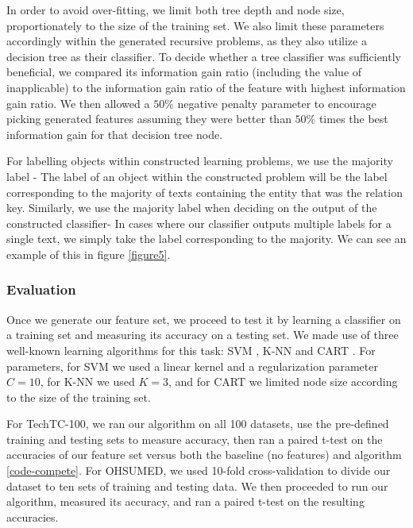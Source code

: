 \documentclass[twoside,11pt]{article}
\theoremstyle{definition}
\begin{document}
In order to avoid over-fitting, we limit both tree depth and node size, proportionately to the size of the training set. We also limit these parameters accordingly within the generated recursive problems, as they also utilize a decision tree as their classifier. To decide whether a tree classifier was sufficiently beneficial, we compared its information gain ratio (including the value of inapplicable) to the information gain ratio of the feature with highest information gain ratio. We then allowed a $50\%$ negative penalty parameter to encourage picking generated features assuming they were better than $50\%$ times the best information gain for that decision tree node. 

For labelling objects within constructed learning problems, we use the majority label - The label of an object within the constructed problem will be the label corresponding to the majority of texts containing the entity that was the relation key. Similarly, we use the majority label when deciding on the output of the constructed classifier- In cases where our classifier outputs multiple labels for a single text, we simply take the label corresponding to the majority. We can see an example of this in figure \ref{figure5}.

\subsubsection{Evaluation}

Once we generate our feature set, we proceed to test it by learning a classifier on a training set and measuring its accuracy on a testing set. We made use of three well-known learning algorithms for this task: SVM \cite{cortes1995support}, K-NN \cite{fix1951discriminatory} and CART \cite {breiman1984classification}.
For parameters, for SVM we used a linear kernel and a regularization parameter $C=10$, for K-NN we used $K=3$, and for CART we limited node size according to the size of the training set.

For TechTC-100, we ran our algorithm on all 100 datasets, use the pre-defined training and testing sets to measure accuracy, then ran a paired t-test on the accuracies of our feature set versus both the baseline (no features) and algorithm \ref{code-compete}.
For OHSUMED, we used 10-fold cross-validation to divide our dataset to ten sets of training and testing data. We then proceeded to run our algorithm, measured its accuracy, and ran a paired t-test on the resulting accuracies.

\end{document}

